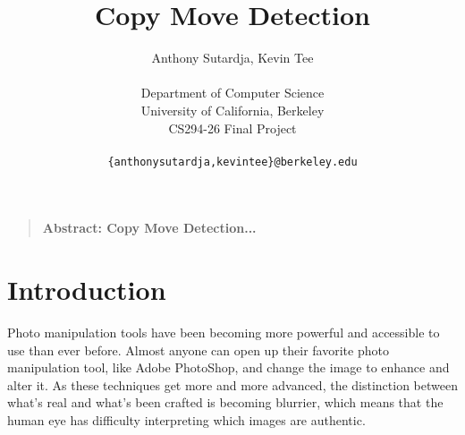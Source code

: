\documentclass[12pt]{article}
\title{Copy Move Detection}
\author
{Anthony Sutardja, Kevin Tee\\
\\
\normalsize{Department of Computer Science}\\
\normalsize{University of California, Berkeley}\\
\normalsize{CS294-26 Final Project}\\
\\
\normalsize\texttt{\{anthonysutardja,kevintee\}@berkeley.edu} 
}
\date{}
\newenvironment{sciabstract}{%
\begin{quote} \bf}
{\end{quote}}
\begin{document}
 


\baselineskip24pt


\maketitle 




\begin{sciabstract}
  Abstract: Copy Move Detection...
\end{sciabstract}




\section*{Introduction}
\begin{raggedleft}
Photo manipulation tools have been becoming more powerful and accessible to use than ever before. Almost anyone can open up their favorite photo manipulation tool, like Adobe PhotoShop, and change the image to enhance and alter it. As these techniques get more and more advanced, the distinction between what’s real and what’s been crafted is becoming blurrier, which means that the human eye has difficulty interpreting which images are authentic.
\end{raggedleft}
\end{document}
